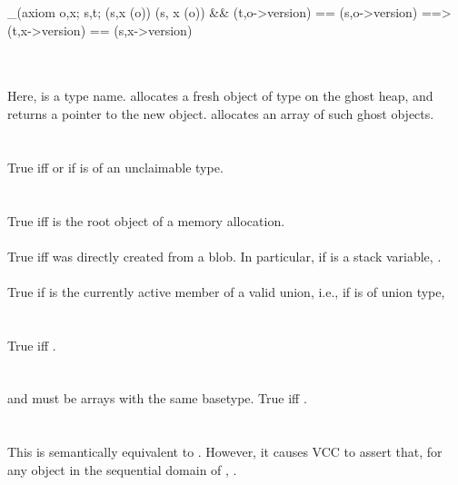 \documentclass[preprint,nocopyrightspace]{sigplanconf}
\begin{document}
{{\begin{VCC}
  _(axiom \forall \object o,x; \forall \state s,t; 
             {\at(s,x \in \domain(o))}
             \at(s, x \in \domain(o)) && \at(t,o->version) == \at(s,o->version) 
             ==> \at(t,x->version) == \at(s,x->version)
\end{VCC}

\\
\\
Here,  is a type name.  allocates a fresh object
of type  on the ghost heap, and returns a pointer to the new
object.  allocates an array of  such
ghost objects.
\\\\
\\
True iff  or if  is of an unclaimable type.
\\\\
\\
True iff  is the root object of a memory allocation.
\\
\\
True iff  was directly created from a blob. In particular,
if  is a stack variable, . 
\\
\\
True if  is the currently active member of a valid union, i.e.,
if  is of union type, 
\\\\
\\
True iff .
\\\\
\\
 and  must be arrays with the same basetype.
True iff .
\\\\
\\
This is semantically equivalent to . However, it
causes VCC to assert that, for any object  in the sequential
domain of , .
\\\\
}}
\end{document}
